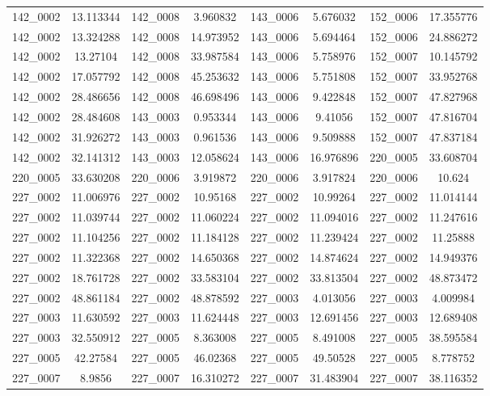 \begin{table}[H]
\begin{tabular}{|c|c|c|c|c|c|c|c|}
        142\_0002 & 13.113344 & 142\_0008 & 3.960832 & 143\_0006 & 5.676032 & 152\_0006 & 17.355776 \\
        142\_0002 & 13.324288 & 142\_0008 & 14.973952 & 143\_0006 & 5.694464 & 152\_0006 & 24.886272 \\
        142\_0002 & 13.27104 & 142\_0008 & 33.987584 & 143\_0006 & 5.758976 & 152\_0007 & 10.145792 \\
        142\_0002 & 17.057792 & 142\_0008 & 45.253632 & 143\_0006 & 5.751808 & 152\_0007 & 33.952768 \\
        142\_0002 & 28.486656 & 142\_0008 & 46.698496 & 143\_0006 & 9.422848 & 152\_0007 & 47.827968 \\
        142\_0002 & 28.484608 & 143\_0003 & 0.953344 & 143\_0006 & 9.41056 & 152\_0007 & 47.816704 \\
        142\_0002 & 31.926272 & 143\_0003 & 0.961536 & 143\_0006 & 9.509888 & 152\_0007 & 47.837184 \\
        142\_0002 & 32.141312 & 143\_0003 & 12.058624 & 143\_0006 & 16.976896 & 220\_0005 & 33.608704 \\
        220\_0005 & 33.630208 & 220\_0006 & 3.919872 & 220\_0006 & 3.917824 & 220\_0006 & 10.624 \\
        227\_0002 & 11.006976 & 227\_0002 & 10.95168 & 227\_0002 & 10.99264 & 227\_0002 & 11.014144 \\
        227\_0002 & 11.039744 & 227\_0002 & 11.060224 & 227\_0002 & 11.094016 & 227\_0002 & 11.247616 \\
        227\_0002 & 11.104256 & 227\_0002 & 11.184128 & 227\_0002 & 11.239424 & 227\_0002 & 11.25888 \\
        227\_0002 & 11.322368 & 227\_0002 & 14.650368 & 227\_0002 & 14.874624 & 227\_0002 & 14.949376 \\
        227\_0002 & 18.761728 & 227\_0002 & 33.583104 & 227\_0002 & 33.813504 & 227\_0002 & 48.873472 \\
        227\_0002 & 48.861184 & 227\_0002 & 48.878592 & 227\_0003 & 4.013056 & 227\_0003 & 4.009984 \\
        227\_0003 & 11.630592 & 227\_0003 & 11.624448 & 227\_0003 & 12.691456 & 227\_0003 & 12.689408 \\
        227\_0003 & 32.550912 & 227\_0005 & 8.363008 & 227\_0005 & 8.491008 & 227\_0005 & 38.595584 \\
        227\_0005 & 42.27584 & 227\_0005 & 46.02368 & 227\_0005 & 49.50528 & 227\_0005 & 8.778752 \\
        227\_0007 & 8.9856 & 227\_0007 & 16.310272 & 227\_0007 & 31.483904 & 227\_0007 & 38.116352 \\

\end{tabular}
\end{table}
